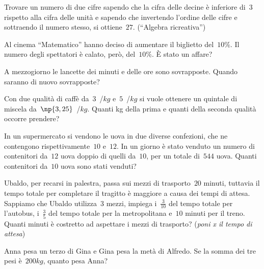 \begin{multicols}{2}
\begin{esercizio}
Trovare un numero di due cifre sapendo che la cifra delle decine è inferiore di~$3$ rispetto alla cifra delle unità e sapendo che invertendo l'ordine delle cifre e sottraendo il numero stesso, si ottiene~$27$. (``Algebra ricreativa'')
\end{esercizio}

\begin{esercizio}
Al cinema ``Matematico'' hanno deciso di aumentare il biglietto del~$10\%$. Il numero degli spettatori è calato, però, del~$10\%$. È stato un affare?
\end{esercizio}

\begin{esercizio}
A mezzogiorno le lancette dei minuti e delle ore sono sovrapposte. Quando saranno di nuovo sovrapposte?
\end{esercizio}

\begin{esercizio}
Con due qualità di caffè da~$3$~\officialeuro/$\unit{kg}$ e~$5$~\officialeuro/$\unit{kg}$ si vuole ottenere un quintale di miscela da~$\np{3,25}$~\officialeuro/$\unit{kg}$. Quanti kg della prima e quanti della seconda qualità occorre prendere?
\end{esercizio}

\begin{esercizio}[\Ast]
In un supermercato si vendono le uova in due diverse confezioni, che ne contengono rispettivamente~$10$ e~$12$. In un giorno è stato venduto un numero di contenitori da~$12$ uova doppio di quelli da~$10$, per un totale di~$544$ uova. Quanti contenitori da~$10$ uova sono stati venduti?
\end{esercizio}

\begin{esercizio}[\Ast]
Ubaldo, per recarsi in palestra, passa sui mezzi di trasporto~$20$ minuti, tuttavia il tempo totale per completare il tragitto è maggiore a causa dei tempi di attesa. Sappiamo che Ubaldo utilizza~$3$ mezzi, impiega i~$\frac{3}{10}$ del tempo totale per l'autobus, i~$\frac{3}{5}$ del tempo totale per la metropolitana e~$10$ minuti per il treno. Quanti minuti è costretto ad aspettare i mezzi di trasporto? (\emph{poni x il tempo di attesa})
\end{esercizio}

\begin{esercizio}[\Ast]
Anna pesa un terzo di Gina e Gina pesa la metà di Alfredo. Se la somma dei tre pesi è~$200\unit{kg}$, quanto pesa Anna?
\end{esercizio}


\end{multicols}

